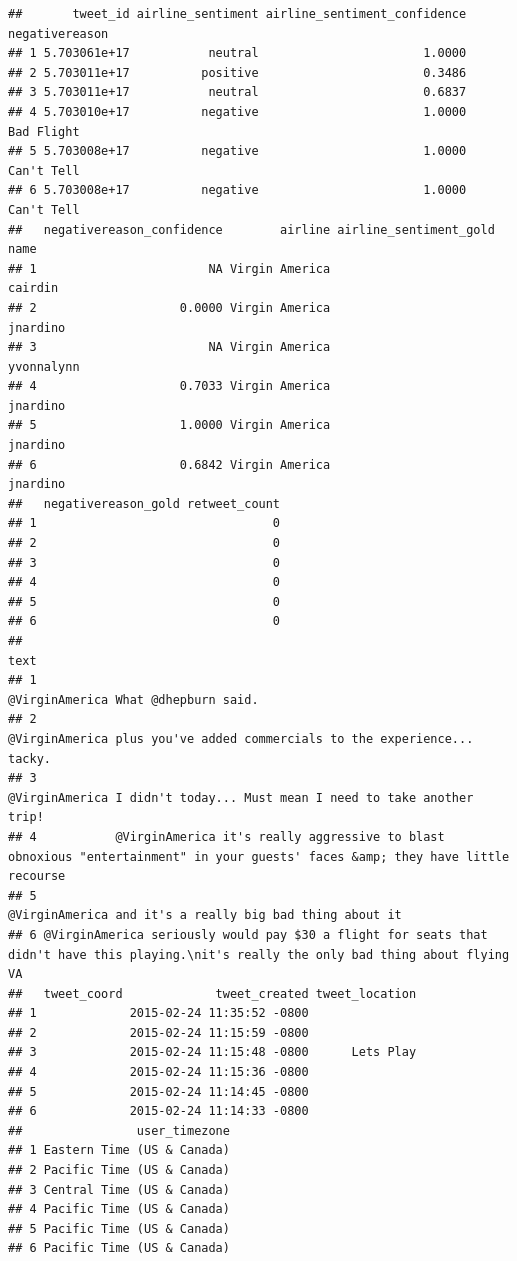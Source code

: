 \documentclass[
]{book}
\begin{document}
\begin{verbatim}
##       tweet_id airline_sentiment airline_sentiment_confidence negativereason
## 1 5.703061e+17           neutral                       1.0000               
## 2 5.703011e+17          positive                       0.3486               
## 3 5.703011e+17           neutral                       0.6837               
## 4 5.703010e+17          negative                       1.0000     Bad Flight
## 5 5.703008e+17          negative                       1.0000     Can't Tell
## 6 5.703008e+17          negative                       1.0000     Can't Tell
##   negativereason_confidence        airline airline_sentiment_gold       name
## 1                        NA Virgin America                           cairdin
## 2                    0.0000 Virgin America                          jnardino
## 3                        NA Virgin America                        yvonnalynn
## 4                    0.7033 Virgin America                          jnardino
## 5                    1.0000 Virgin America                          jnardino
## 6                    0.6842 Virgin America                          jnardino
##   negativereason_gold retweet_count
## 1                                 0
## 2                                 0
## 3                                 0
## 4                                 0
## 5                                 0
## 6                                 0
##                                                                                                                                       text
## 1                                                                                                      @VirginAmerica What @dhepburn said.
## 2                                                                 @VirginAmerica plus you've added commercials to the experience... tacky.
## 3                                                                  @VirginAmerica I didn't today... Must mean I need to take another trip!
## 4           @VirginAmerica it's really aggressive to blast obnoxious "entertainment" in your guests' faces &amp; they have little recourse
## 5                                                                                  @VirginAmerica and it's a really big bad thing about it
## 6 @VirginAmerica seriously would pay $30 a flight for seats that didn't have this playing.\nit's really the only bad thing about flying VA
##   tweet_coord             tweet_created tweet_location
## 1             2015-02-24 11:35:52 -0800               
## 2             2015-02-24 11:15:59 -0800               
## 3             2015-02-24 11:15:48 -0800      Lets Play
## 4             2015-02-24 11:15:36 -0800               
## 5             2015-02-24 11:14:45 -0800               
## 6             2015-02-24 11:14:33 -0800               
##                user_timezone
## 1 Eastern Time (US & Canada)
## 2 Pacific Time (US & Canada)
## 3 Central Time (US & Canada)
## 4 Pacific Time (US & Canada)
## 5 Pacific Time (US & Canada)
## 6 Pacific Time (US & Canada)
\end{verbatim}
\end{document}
